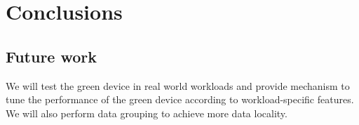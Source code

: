 \section{Conclusions}
\label{sec:conc}


\subsection{Future work}

We will test the green device in real world workloads and provide
mechanism to tune the performance of the green device according to
workload-specific features. We will also perform data grouping to
achieve more data locality. 

